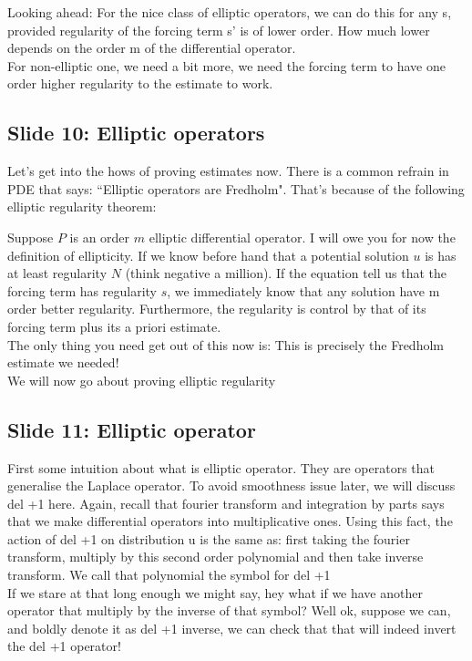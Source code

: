 \documentclass{article}
\begin{document}
Looking ahead: 
For the nice class of elliptic operators, we can do this for any s, provided regularity of the forcing term s' is of lower order. How much lower depends on the order m of the differential operator. \\

For non-elliptic one, we need a bit more, we need the forcing term to have one order higher regularity to the estimate to work. \\


\subsection{Slide 10: Elliptic operators}
Let's get into the hows of proving estimates now. There is a common refrain in PDE that says: ``Elliptic operators are Fredholm". That's because of the following elliptic regularity theorem: 

Suppose $P$ is an order $m$ elliptic differential operator. I will owe you for now the definition of ellipticity. 
If we know before hand that a potential solution $u$ is has at least regularity $N$ (think negative a million). If the equation tell us that the forcing term has regularity $s$, we immediately know that any solution have m order better regularity. Furthermore, the regularity is control by that of its forcing term plus its a priori estimate. \\

The only thing you need get out of this now is: This is precisely the Fredholm estimate we needed! \\

We will now go about proving elliptic regularity

\subsection{Slide 11: Elliptic operator}
First some intuition about what is elliptic operator. They are operators that generalise the Laplace operator. To avoid smoothness issue later, we will discuss del +1 here. Again, recall that fourier transform and integration by parts says that we make differential operators into multiplicative ones. Using this fact, the action of del +1 on distribution u is the same as:  first taking the fourier transform, multiply by this second order polynomial and then take inverse transform. We call that polynomial the symbol for del +1\\

If we stare at that long enough we might say, hey what if we have another operator that multiply by the inverse of that symbol? Well ok, suppose we can, and boldly denote it as del +1 inverse, we can check that that will indeed invert the del +1 operator! 
\end{document}
